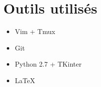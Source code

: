 \section{Outils utilisés}
\begin{itemize}
  \item Vim + Tmux
  \item Git
  \item Python 2.7 + TKinter
  \item \LaTeX
\end{itemize}
